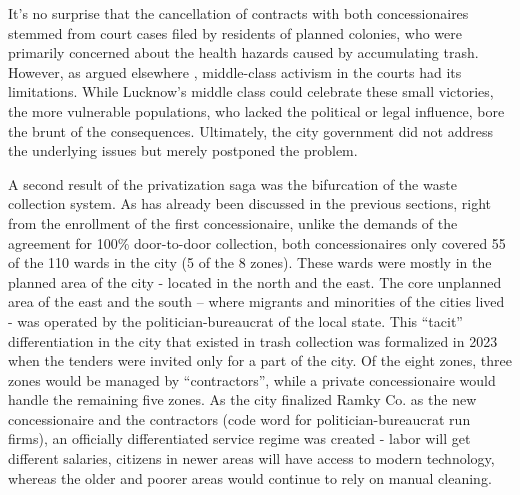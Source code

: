 It's no surprise that the cancellation of contracts with both concessionaires stemmed from court cases filed by residents of planned colonies, who were primarily concerned about the health hazards caused by accumulating trash. However, as argued elsewhere \citep{Ghertner2015}, middle-class activism in the courts had its limitations. While Lucknow's middle class could celebrate these small victories, the more vulnerable populations, who lacked the political or legal influence, bore the brunt of the consequences. Ultimately, the city government did not address the underlying issues but merely postponed the problem.

A second result of the privatization saga was the bifurcation of the waste collection system. As has already been discussed in the previous sections, right from the enrollment of the first concessionaire, unlike the demands of the agreement for 100\% door-to-door collection, both concessionaires only covered 55 of the 110 wards in the city (5 of the 8 zones). These wards were mostly in the planned area of the city - located in the north and the east. The core unplanned area of the east and the south – where migrants and minorities of the cities lived - was operated by the politician-bureaucrat of the local state. This ``tacit'' differentiation in the city that existed in trash collection was formalized in 2023 when the tenders were invited only for a part of the city. Of the eight zones, three zones would be managed by ``contractors'', while a private concessionaire would handle the remaining five zones. As the city finalized Ramky Co. as the new concessionaire and the contractors (code word for politician-bureaucrat run firms), an officially differentiated service regime was created - labor will get different salaries, citizens in newer areas will have access to modern technology, whereas the older and poorer areas would continue to rely on manual cleaning.

